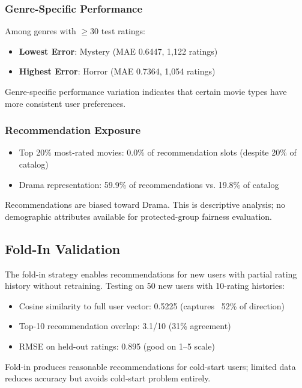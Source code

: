 \documentclass[11pt,a4paper]{article}
\begin{document}
\subsubsection{Genre-Specific Performance}

Among genres with $\geq$30 test ratings:

\begin{itemize}
    \item \textbf{Lowest Error}: Mystery (MAE 0.6447, 1,122 ratings)
    \item \textbf{Highest Error}: Horror (MAE 0.7364, 1,054 ratings)
\end{itemize}

Genre-specific performance variation indicates that certain movie types have more consistent user preferences.

\subsubsection{Recommendation Exposure}

\begin{itemize}
    \item Top 20\% most-rated movies: 0.0\% of recommendation slots (despite 20\% of catalog)
    \item Drama representation: 59.9\% of recommendations vs. 19.8\% of catalog
\end{itemize}

Recommendations are biased toward Drama. This is descriptive analysis; no demographic attributes available for protected-group fairness evaluation.

\subsection{Fold-In Validation}

The fold-in strategy enables recommendations for new users with partial rating history without retraining. Testing on 50 new users with 10-rating histories:

\begin{itemize}
    \item Cosine similarity to full user vector: 0.5225 (captures ~52\% of direction)
    \item Top-10 recommendation overlap: 3.1/10 (31\% agreement)
    \item RMSE on held-out ratings: 0.895 (good on 1–5 scale)
\end{itemize}

Fold-in produces reasonable recommendations for cold-start users; limited data reduces accuracy but avoids cold-start problem entirely.
\end{document}
